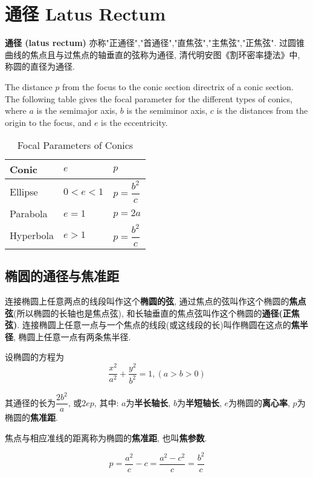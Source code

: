 \chapter{通径 Latus Rectum}\label{ch:latus-rectum}

\textbf{通径 (latus rectum)} 亦称"正通径","首通径","直焦弦","主焦弦","正焦弦". 
过圆锥曲线的焦点且与过焦点的轴垂直的弦称为通径, 清代明安图《割环密率捷法》中, 称圆的直径为通径. 

The distance $p$ from the focus to the conic section directrix of a conic section. 
The following table gives the focal parameter for the different types of conics, 
where $a$ is the semimajor axis, $b$ is the semiminor axis, $c$ is the distances from the origin to the focus, 
and $e$ is the eccentricity.

\begin{table}[H]
  \centering
  \caption{Focal Parameters of Conics}
  \begin{tabular}{p{}|m{}|m{}}
    \toprule
    \rowcolor{cyan!40}
     Conic & $e$ & $p$ \\
    \midrule
    Ellipse & $0 < e <1$ & $p=\dfrac{b^2}{c}$ \\
    Parabola & $e = 1$ & $p=2a$ \\
    Hyperbola & $e > 1$ & $p=\dfrac{b^2}{c}$ \\
    \bottomrule
  \end{tabular}
\end{table}

\section{椭圆的通径与焦准距}

连接椭圆上任意两点的线段叫作这个\textbf{椭圆的弦}, 
通过焦点的弦叫作这个椭圆的\textbf{焦点弦}(所以椭圆的长轴也是焦点弦), 
和长轴垂直的焦点弦叫作这个椭圆的\textbf{通径(正焦弦)}. 
连接椭圆上任意一点与一个焦点的线段(或这线段的长)叫作椭圆在这点的\textbf{焦半径}, 
椭圆上任意一点有两条焦半径. 

设椭圆的方程为
\[
  \dfrac{x^2}{a^2}+\dfrac{y^2}{b^2}=1,(a > b > 0)
\]

其通径的长为$\dfrac{2b^2}{a}$, 或$2ep$,
其中: $a$为\textbf{半长轴长}, $b$为\textbf{半短轴长}, $e$为椭圆的\textbf{离心率}, $p$为椭圆的\textbf{焦准距}. 

焦点与相应准线的距离称为椭圆的\textbf{焦准距}, 也叫\textbf{焦参数}. 

\[
  p=\dfrac{a^2}{c}-c=\dfrac{a^2-c^2}{c}=\dfrac{b^2}{c}
\]

